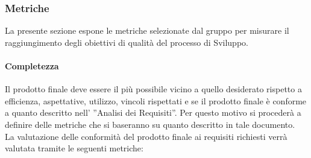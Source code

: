 		\subsubsection{Metriche}
			La presente sezione espone le metriche selezionate dal gruppo per misurare il raggiungimento degli obiettivi di qualità del processo di Sviluppo. \\
			\paragraph{Completezza}
				Il prodotto finale deve essere il più possibile vicino a quello desiderato rispetto a efficienza, aspettative, utilizzo, vincoli rispettati e se il prodotto finale è conforme a quanto descritto nell’ ”Analisi dei Requisiti”. Per questo motivo si procederà a definire delle metriche che si baseranno su quanto descritto in tale documento.\\
				La valutazione delle conformità del prodotto finale ai requisiti richiesti verrà valutata tramite le seguenti metriche:\\
